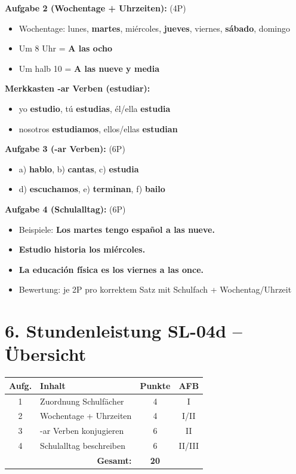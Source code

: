 \documentclass[11pt, a4paper]{article}
\newcommand{\loesung}[1]{\textcolor{loesung}{\textbf{#1}}}
\begin{document}
\textbf{Aufgabe 2 (Wochentage + Uhrzeiten):} (4P)
\begin{itemize}
    \item Wochentage: lunes, \loesung{martes}, miércoles, \loesung{jueves}, viernes, \loesung{sábado}, domingo
    \item Um 8 Uhr = \loesung{A las ocho}
    \item Um halb 10 = \loesung{A las nueve y media}
\end{itemize}

\textbf{Merkkasten -ar Verben (estudiar):}
\begin{itemize}
    \item yo \loesung{estudio}, tú \loesung{estudias}, él/ella \loesung{estudia}
    \item nosotros \loesung{estudiamos}, ellos/ellas \loesung{estudian}
\end{itemize}

\textbf{Aufgabe 3 (-ar Verben):} (6P)
\begin{itemize}
    \item a) \loesung{hablo}, b) \loesung{cantas}, c) \loesung{estudia}
    \item d) \loesung{escuchamos}, e) \loesung{terminan}, f) \loesung{bailo}
\end{itemize}

\textbf{Aufgabe 4 (Schulalltag):} (6P)
\begin{itemize}
    \item Beispiele: \loesung{Los martes tengo español a las nueve.}
    \item \loesung{Estudio historia los miércoles.}
    \item \loesung{La educación física es los viernes a las once.}
    \item Bewertung: je 2P pro korrektem Satz mit Schulfach + Wochentag/Uhrzeit
\end{itemize}

\section*{6. Stundenleistung SL-04d -- Übersicht}

\begin{tabular}{|c|l|c|c|}
\hline
\textbf{Aufg.} & \textbf{Inhalt} & \textbf{Punkte} & \textbf{AFB} \\
\hline
1 & Zuordnung Schulfächer & 4 & I \\
\hline
2 & Wochentage + Uhrzeiten & 4 & I/II \\
\hline
3 & -ar Verben konjugieren & 6 & II \\
\hline
4 & Schulalltag beschreiben & 6 & II/III \\
\hline
\multicolumn{2}{|r|}{\textbf{Gesamt:}} & \textbf{20} & \\
\hline
\end{tabular}
\end{document}

